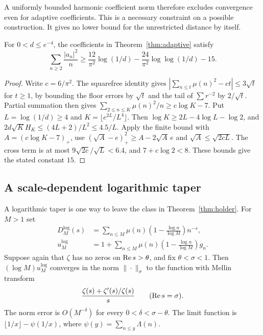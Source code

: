 A uniformly bounded harmonic coefficient norm therefore excludes convergence even for adaptive coefficients. This is a necessary constraint on a possible construction. It gives no lower bound for the unrestricted distance by itself.

\begin{corollary}\label{cor:adaptive-explicit}
For \(0<d\le e^{-4}\), the coefficients in Theorem~\ref{thm:adaptive} satisfy
\[
 \sum_{n\ge2}\frac{|a_n|^2}{n}
 \ge\frac{12}{\pi^2}\log(1/d)
     -\frac{24}{\pi^2}\log\log(1/d)-15 .
\]
\end{corollary}
\begin{proof}
Write \(c=6/\pi^2\). The squarefree identity gives
\(\left|\sum_{n\le t}\mu(n)^2-ct\right|\le3\sqrt t\) for \(t\ge1\), by bounding the floor errors by \(\sqrt t\) and the tail of \(\sum r^{-2}\) by \(2/\sqrt t\). Partial summation then gives \(\sum_{2\le n\le K}\mu(n)^2/n\ge c\log K-7\). Put \(L=\log(1/d)\ge4\) and \(K=\lfloor e^{2L}/L^4\rfloor\). Then \(\log K\ge2L-4\log L-\log2\), and \(2d\sqrt K H_K\le(4L+2)/L^2\le4.5/L\). Apply the finite bound with \(A=(c\log K-7)_+\), use \((\sqrt A-e)_+^2\ge A-2\sqrt A\,e\) and \(\sqrt A\le\sqrt{2cL}\). The cross term is at most \(9\sqrt{2c}/\sqrt L<6.4\), and \(7+c\log2<8\). These bounds give the stated constant \(15\).
\end{proof}

\subsection{A scale-dependent logarithmic taper}

A logarithmic taper is one way to leave the class in Theorem~\ref{thm:holder}. For \(M>1\) set
\begin{align*}
 D_M^{\log}(s)&=\sum_{n\le M}\mu(n)
        \left(1-\frac{\log n}{\log M}\right)n^{-s},\\
 u_M^{\log}&=1+\sum_{n\le M}\mu(n)
        \left(1-\frac{\log n}{\log M}\right)g_n .
\end{align*}
Suppose again that \(\zeta\) has no zeros on \(\operatorname{Re} s>\theta\), and fix \(\theta<\sigma<1\). Then \((\log M)u_M^{\log}\) converges in the norm \(\|\cdot\|_\sigma\) to the function with Mellin transform
\begin{equation}\label{eq:logprofile}
 \frac{\zeta(s)+\zeta'(s)/\zeta(s)}{s}\qquad (\operatorname{Re} s=\sigma).
\end{equation}
The norm error is \(O(M^{-\delta})\) for every \(0<\delta<\sigma-\theta\). The limit function is \(\lfloor1/x\rfloor-\psi(1/x)\), where \(\psi(y)=\sum_{n\le y}\Lambda(n)\).

